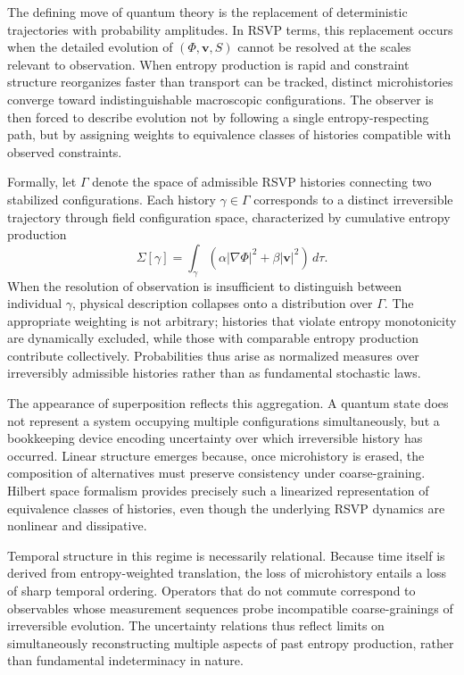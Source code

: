 \documentclass[11pt]{article}
\begin{document}
The defining move of quantum theory is the replacement of deterministic trajectories with probability amplitudes. In RSVP terms, this replacement occurs when the detailed evolution of $(\Phi, \mathbf{v}, S)$ cannot be resolved at the scales relevant to observation. When entropy production is rapid and constraint structure reorganizes faster than transport can be tracked, distinct microhistories converge toward indistinguishable macroscopic configurations. The observer is then forced to describe evolution not by following a single entropy-respecting path, but by assigning weights to equivalence classes of histories compatible with observed constraints.

Formally, let $\Gamma$ denote the space of admissible RSVP histories connecting two stabilized configurations. Each history $\gamma \in \Gamma$ corresponds to a distinct irreversible trajectory through field configuration space, characterized by cumulative entropy production
\begin{equation}
\Sigma[\gamma] = \int_\gamma \left( \alpha \lvert \nabla \Phi \rvert^2 + \beta \lvert \mathbf{v} \rvert^2 \right) \, d\tau.
\end{equation}
When the resolution of observation is insufficient to distinguish between individual $\gamma$, physical description collapses onto a distribution over $\Gamma$. The appropriate weighting is not arbitrary; histories that violate entropy monotonicity are dynamically excluded, while those with comparable entropy production contribute collectively. Probabilities thus arise as normalized measures over irreversibly admissible histories rather than as fundamental stochastic laws.

The appearance of superposition reflects this aggregation. A quantum state does not represent a system occupying multiple configurations simultaneously, but a bookkeeping device encoding uncertainty over which irreversible history has occurred. Linear structure emerges because, once microhistory is erased, the composition of alternatives must preserve consistency under coarse-graining. Hilbert space formalism provides precisely such a linearized representation of equivalence classes of histories, even though the underlying RSVP dynamics are nonlinear and dissipative.

Temporal structure in this regime is necessarily relational. Because time itself is derived from entropy-weighted translation, the loss of microhistory entails a loss of sharp temporal ordering. Operators that do not commute correspond to observables whose measurement sequences probe incompatible coarse-grainings of irreversible evolution. The uncertainty relations thus reflect limits on simultaneously reconstructing multiple aspects of past entropy production, rather than fundamental indeterminacy in nature.
\end{document}
